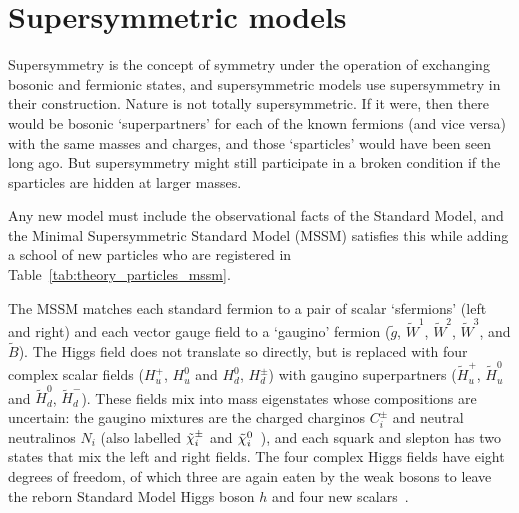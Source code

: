 \section{Supersymmetric models}
\label{sec:theory_susy}
Supersymmetry is the concept of symmetry under the operation of exchanging
bosonic and fermionic states, and supersymmetric models use supersymmetry in
their construction.
Nature is not totally supersymmetric.
If it were, then there would be bosonic `superpartners' for each of the known
fermions (and vice versa) with the same masses and charges, and those
`sparticles' would have been seen long ago.
But supersymmetry might still participate in a broken condition if the
sparticles are hidden at larger masses.

Any new model must include the observational facts of the Standard Model,
and the Minimal Supersymmetric Standard Model (MSSM) satisfies this while
adding a school of new particles
who are registered in Table~\ref{tab:theory_particles_mssm}.

The MSSM matches each standard fermion to a pair of scalar
`sfermions' (left and right)
and each vector gauge field to a `gaugino' fermion
($\tilde g$, $\tilde W^1$, $\tilde W^2$, $\tilde W^3$, and $\tilde B$).
The Higgs field does not translate so directly, but is replaced with four
complex scalar fields
($H^+_u$, $H^0_u$ and $H^0_d$, $H^\pm_d$) with
gaugino superpartners
($\tilde H^+_u$, $\tilde H^0_u$ and $\tilde H^0_d$, $\tilde H^-_d$).
These fields mix into mass eigenstates whose compositions are uncertain:
the gaugino mixtures are the charged charginos $C^\pm_i$ and
neutral neutralinos $N_i$
(also labelled $\tilde\chi^\pm_i$ and $\tilde\chi^0_i$~\cite{atlas2022searches}),
and each squark and slepton has two states that mix the left and right fields.
The four complex Higgs fields have eight degrees of freedom, of which three are
again eaten by the weak bosons to leave the reborn Standard Model Higgs boson $h$
and four new scalars~\cite{martin2016primer}.

